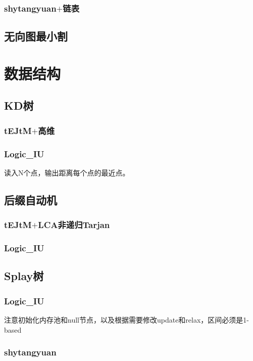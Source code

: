 \documentclass[a4paper,10pt]{book}
\begin{document}
		\subsection{shytangyuan$+$链表}
			
	\section{无向图最小割}
		

\chapter{数据结构}
	\section{KD树}
		\subsection{tEJtM$+$高维}
			

	    \subsection{Logic\_IU}
	        读入N个点，输出距离每个点的最近点。
	        

	\section{后缀自动机}
		\subsection{tEJtM$+$LCA非递归Tarjan}
			
		\subsection{Logic\_IU}
			

    \section{Splay树}
		\subsection{Logic\_IU}
			注意初始化内存池和null节点，以及根据需要修改update和relax，区间必须是1-based
			
		\subsection{shytangyuan}
			
\end{document}
